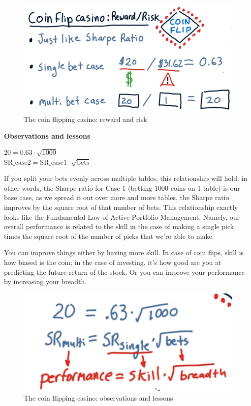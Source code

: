 \documentclass[12pt]{article}
\begin{document}
\begin{figure}[!ht]
\centering
\includegraphics[scale=0.4]{fig/fig62}
\caption{The coin flipping casino: reward and risk}
\end{figure}

\noindent 
\textbf{Observations and lessons} 

\begin{centering}
$20 = 0.63\cdot\sqrt{1000}$ \\
$\text{SR\_{case2}} = \text{SR\_{case1}}\cdot\sqrt{\text{bets}}$ \\
\end{centering}

If you split your bets evenly across multiple tables, this relationship will hold. in other words, the Sharpe ratio for Case 1 (betting 1000 coins on 1 table) is our base case, as we spread it out over more and more tables, the Sharpe ratio improves by the square root of that number of bets. This relationship exactly looks like the Fundamental Law of Active Portfolio Management. Namely, our overall performance is related to the skill in the case of making a single pick times the square root of the number of picks that we're able to make. 

You can improve things either by having more skill. In case of coin flips, skill is how biased is the coin; in the case of investing, it's how good are you at predicting the future return of the stock. Or you can improve your performance by increasing your breadth.

\begin{figure}[!ht]
\centering
\includegraphics[scale=0.4]{fig/fig63}
\caption{The coin flipping casino: observations and lessons}
\end{figure}
\end{document}
